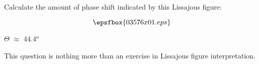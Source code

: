 

Calculate the amount of phase shift indicated by this Lissajous figure:

$$\epsfbox{03576x01.eps}$$







$\Theta$ $\approx$ 44.4$^{o}$







This question is nothing more than an exercise in Lissajous figure interpretation.




